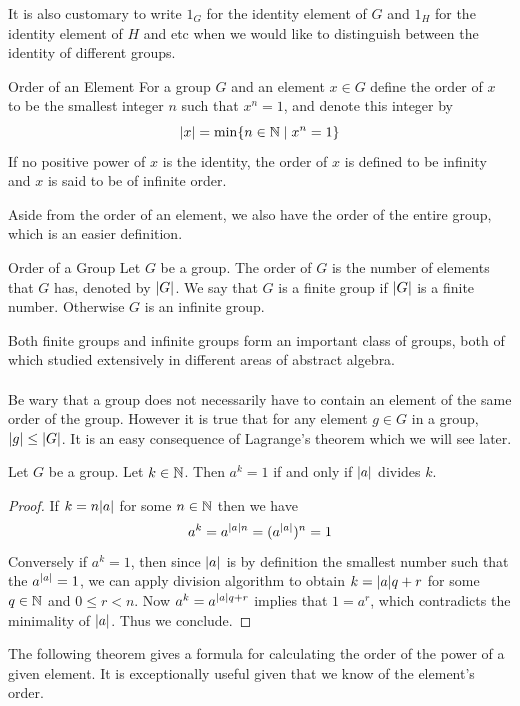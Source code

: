 \documentclass[a4paper]{article}
\begin{document}
It is also customary to write $1_G$ for the identity element of $G$ and $1_H$ for the identity element of $H$ and etc when we would like to distinguish between the identity of different groups. 

\begin{defn}{Order of an Element}{} For a group $G$ and an element $x\in G$ define the order of $x$ to be the smallest integer $n$ such that $x^n=1$, and denote this integer by $$\abs{x}=\min\{n\in\mathbb{N}\;|\;x^n=1\}$$ If no positive power of $x$ is the identity, the order of $x$ is defined to be infinity and $x$ is said to be of infinite order. 
\end{defn}

Aside from the order of an element, we also have the order of the entire group, which is an easier definition. 

\begin{defn}{Order of a Group}{} Let $G$ be a group. The order of $G$ is the number of elements that $G$ has, denoted by $\abs{G}$. We say that $G$ is a finite group if $\abs{G}$ is a finite number. Otherwise $G$ is an infinite group. 
\end{defn}

Both finite groups and infinite groups form an important class of groups, both of which studied extensively in different areas of abstract algebra. \\~\\

Be wary that a group does not necessarily have to contain an element of the same order of the group. However it is true that for any element $g\in G$ in a group, $\abs{g}\leq\abs{G}$. It is an easy consequence of Lagrange's theorem which we will see later. 

\begin{lmm}{}{} Let $G$ be a group. Let $k\in\mathbb{N}$. Then $a^k=1$ if and only if $\abs{a}$ divides $k$. \tcbline
\begin{proof}
If $k=n\abs{a}$ for some $n\in\mathbb{N}$ then we have $$a^k=a^{\abs{a}n}=(a^\abs{a})^n=1$$ Conversely if $a^k=1$, then since $\abs{a}$ is by definition the smallest number such that the $a^\abs{a}=1$, we can apply division algorithm to obtain $k=\abs{a}q+r$ for some $q\in\mathbb{N}$ and $0\leq r<n$. Now $a^{k}=a^{\abs{a}q+r}$ implies that $1=a^r$, which contradicts the minimality of $\abs{a}$. Thus we conclude. 
\end{proof}
\end{lmm}

The following theorem gives a formula for calculating the order of the power of a given element. It is exceptionally useful given that we know of the element's order. 
\end{document}
